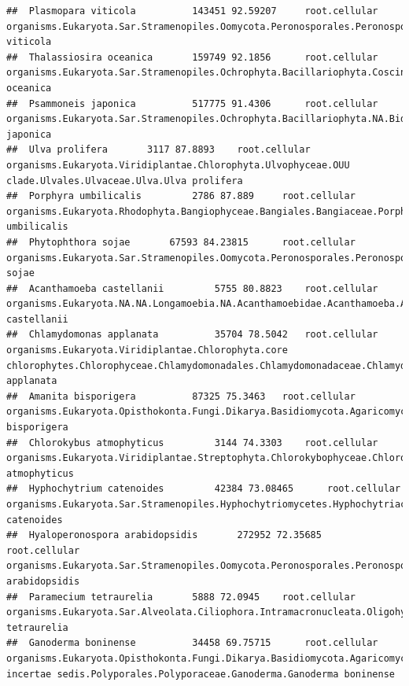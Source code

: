 \documentclass{article}\usepackage[]{graphicx}\usepackage[]{color}
\makeatletter
\newenvironment{kframe}{%
 \def\at@end@of@kframe{}%
 \ifinner\ifhmode%
  \def\at@end@of@kframe{\end{minipage}}%
  \begin{minipage}{\columnwidth}%
 \fi\fi%
 \def\FrameCommand##1{\hskip\@totalleftmargin \hskip-\fboxsep
 \colorbox{shadecolor}{##1}\hskip-\fboxsep
     \hskip-\linewidth \hskip-\@totalleftmargin \hskip\columnwidth}%
 \MakeFramed {\advance\hsize-\width
   \@totalleftmargin\z@ \linewidth\hsize
   \@setminipage}}%
 {\par\unskip\endMakeFramed%
 \at@end@of@kframe}
\newenvironment{knitrout}{}{} %
\makeatother
\begin{document}
\begin{knitrout}
\begin{kframe}
\begin{verbatim}
##  Plasmopara viticola 		 143451 92.59207 	 root.cellular organisms.Eukaryota.Sar.Stramenopiles.Oomycota.Peronosporales.Peronosporaceae.Plasmopara.Plasmopara viticola
##  Thalassiosira oceanica 		 159749 92.1856 	 root.cellular organisms.Eukaryota.Sar.Stramenopiles.Ochrophyta.Bacillariophyta.Coscinodiscophyceae.Thalassiosirophycidae.Thalassiosirales.Thalassiosiraceae.Thalassiosira.Thalassiosira oceanica
##  Psammoneis japonica 		 517775 91.4306 	 root.cellular organisms.Eukaryota.Sar.Stramenopiles.Ochrophyta.Bacillariophyta.NA.Biddulphiophycidae.Triceratiales.Plagiogrammaceae.NA.Psammoneis japonica
##  Ulva prolifera 		 3117 87.8893 	 root.cellular organisms.Eukaryota.Viridiplantae.Chlorophyta.Ulvophyceae.OUU clade.Ulvales.Ulvaceae.Ulva.Ulva prolifera
##  Porphyra umbilicalis 		 2786 87.889 	 root.cellular organisms.Eukaryota.Rhodophyta.Bangiophyceae.Bangiales.Bangiaceae.Porphyra.Porphyra umbilicalis
##  Phytophthora sojae 		 67593 84.23815 	 root.cellular organisms.Eukaryota.Sar.Stramenopiles.Oomycota.Peronosporales.Peronosporaceae.Phytophthora.Phytophthora sojae
##  Acanthamoeba castellanii 		 5755 80.8823 	 root.cellular organisms.Eukaryota.NA.NA.Longamoebia.NA.Acanthamoebidae.Acanthamoeba.Acanthamoeba castellanii
##  Chlamydomonas applanata 		 35704 78.5042 	 root.cellular organisms.Eukaryota.Viridiplantae.Chlorophyta.core chlorophytes.Chlorophyceae.Chlamydomonadales.Chlamydomonadaceae.Chlamydomonas.Chlamydomonas applanata
##  Amanita bisporigera 		 87325 75.3463 	 root.cellular organisms.Eukaryota.Opisthokonta.Fungi.Dikarya.Basidiomycota.Agaricomycotina.Agaricomycetes.Agaricomycetidae.Agaricales.Amanitaceae.Amanita.Amanita bisporigera
##  Chlorokybus atmophyticus 		 3144 74.3303 	 root.cellular organisms.Eukaryota.Viridiplantae.Streptophyta.Chlorokybophyceae.Chlorokybales.Chlorokybaceae.Chlorokybus.Chlorokybus atmophyticus
##  Hyphochytrium catenoides 		 42384 73.08465 	 root.cellular organisms.Eukaryota.Sar.Stramenopiles.Hyphochytriomycetes.Hyphochytriaceae.Hyphochytrium.Hyphochytrium catenoides
##  Hyaloperonospora arabidopsidis 		 272952 72.35685 	 root.cellular organisms.Eukaryota.Sar.Stramenopiles.Oomycota.Peronosporales.Peronosporaceae.Hyaloperonospora.Hyaloperonospora arabidopsidis
##  Paramecium tetraurelia 		 5888 72.0945 	 root.cellular organisms.Eukaryota.Sar.Alveolata.Ciliophora.Intramacronucleata.Oligohymenophorea.Peniculida.Parameciidae.Paramecium.Paramecium tetraurelia
##  Ganoderma boninense 		 34458 69.75715 	 root.cellular organisms.Eukaryota.Opisthokonta.Fungi.Dikarya.Basidiomycota.Agaricomycotina.Agaricomycetes.Agaricomycetes incertae sedis.Polyporales.Polyporaceae.Ganoderma.Ganoderma boninense

\end{verbatim}
\end{kframe}
\end{knitrout}
\end{document}
